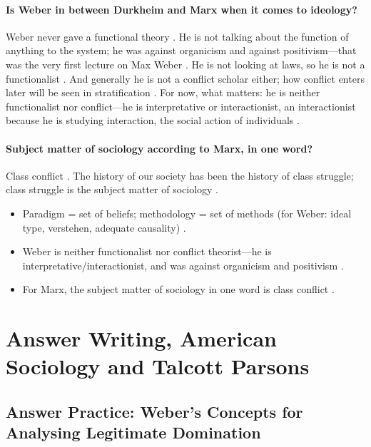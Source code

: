 \paragraph{Is Weber in between Durkheim and Marx when it comes to ideology?}
Weber never gave a functional theory . He is not talking about the function of anything to the system; he was against organicism and against positivism---that was the very first lecture on Max Weber .
He is not looking at laws, so he is not a functionalist . And generally he is not a conflict scholar either; how conflict enters later will be seen in stratification .
For now, what matters: he is neither functionalist nor conflict---he is interpretative or interactionist, an interactionist because he is studying interaction, the social action of individuals .

\paragraph{Subject matter of sociology according to Marx, in one word?}
Class conflict . The history of our society has been the history of class struggle; class struggle is the subject matter of sociology .

\begin{QuickRevision}
\begin{itemize}
    \item Paradigm = set of beliefs; methodology = set of methods (for Weber: ideal type, verstehen, adequate causality) .
    \item Weber is neither functionalist nor conflict theorist---he is interpretative/interactionist, and was against organicism and positivism .
    \item For Marx, the subject matter of sociology in one word is class conflict .
\end{itemize}
\end{QuickRevision}

\sectiondivider

\section{Answer Writing, American Sociology and Talcott Parsons}

\subsection{Answer Practice: Weber's Concepts for Analysing Legitimate Domination}

